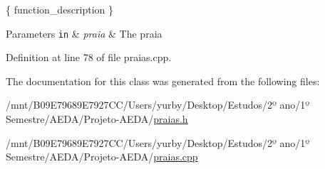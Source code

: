 \{ function\+\_\+description \} 


\begin{DoxyParams}[1]{Parameters}
\mbox{\tt in}  & {\em praia} & The praia \\
\hline
\end{DoxyParams}


Definition at line 78 of file praias.\+cpp.



The documentation for this class was generated from the following files\+:\begin{DoxyCompactItemize}
\item 
/mnt/\+B09\+E79689\+E7927\+C\+C/\+Users/yurby/\+Desktop/\+Estudos/2º ano/1º Semestre/\+A\+E\+D\+A/\+Projeto-\/\+A\+E\+D\+A/\hyperlink{praias_8h}{praias.\+h}\item 
/mnt/\+B09\+E79689\+E7927\+C\+C/\+Users/yurby/\+Desktop/\+Estudos/2º ano/1º Semestre/\+A\+E\+D\+A/\+Projeto-\/\+A\+E\+D\+A/\hyperlink{praias_8cpp}{praias.\+cpp}\end{DoxyCompactItemize}
